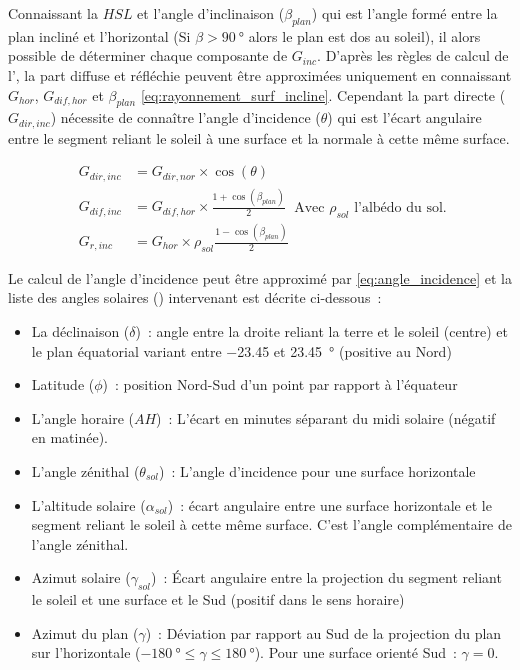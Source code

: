 Connaissant la $HSL$ et l’angle d’inclinaison ($\beta_{plan}$) qui est l’angle formé entre
la plan incliné et l’horizontal (Si $\beta > \SI{90}{\degree}$ alors le plan est dos au
soleil), il alors possible de déterminer chaque composante de $G_{inc}$. D’après les
règles de calcul de l’\textit{}, la part diffuse et réfléchie peuvent être
approximées uniquement en connaissant $G_{hor}$, $G_{dif, hor}$ et $\beta_{plan}$
\eqref{eq:rayonnement_surf_incline}. Cependant la part directe ($G_{dir, inc}$) nécessite
de connaître l’angle d’incidence ($\theta$) qui est l’écart angulaire entre le segment
reliant le soleil à une surface et la normale à cette même surface.

\begin{equation}\label{eq:rayonnement_surf_incline}
    \begin{aligned}
        G_{dir, inc} &= G_{dir, nor} \times \cos(\theta) \\[10pt]
        G_{dif, inc} &= G_{dif, hor} \times \frac{1 + \cos(\beta_{plan})}{2} \\[10pt]
        G_{r, inc}   &= G_{hor} \times \rho_{sol} \frac{1 - \cos(\beta_{plan})}{2}
    \end{aligned}
    \text{Avec $\rho_{sol}$ l’albédo du sol.}
\end{equation}

Le calcul de l’angle d’incidence peut être approximé par \eqref{eq:angle_incidence}
\parencite{Cooper1969333,Duffie1980} et la liste des angles solaires
() intervenant est décrite ci-dessous~:
\begin{itemize}
    \item La déclinaison ($\delta$)~: angle entre la droite reliant la terre et le soleil
          (centre) et le plan équatorial variant entre \num{-23.45} et \SI{23.45}{\degree}
          (positive au Nord)
    \item Latitude ($\phi$)~: position Nord-Sud d’un point par rapport à l’équateur
    \item L’angle horaire ($AH$)~: L’écart en minutes séparant du midi solaire (négatif en matinée).
    \item L’angle zénithal ($\theta_{sol}$)~: L’angle d’incidence pour une surface horizontale
    \item L’altitude solaire ($\alpha_{sol}$)~: écart angulaire entre une surface horizontale et le segment reliant
          le soleil à cette même surface. C’est l’angle complémentaire de l’angle zénithal.
    \item Azimut solaire ($\gamma_{sol}$)~: Écart angulaire entre la projection du segment reliant
          le soleil et une surface et le Sud (positif dans le sens horaire)
    \item Azimut du plan ($\gamma$)~: Déviation par rapport au Sud de la projection
          du plan sur l’horizontale ($\SI{-180}{\degree} \leq \gamma \leq \SI{180}{\degree}$).
          Pour une surface orienté Sud~: $\gamma=0$.
\end{itemize}

